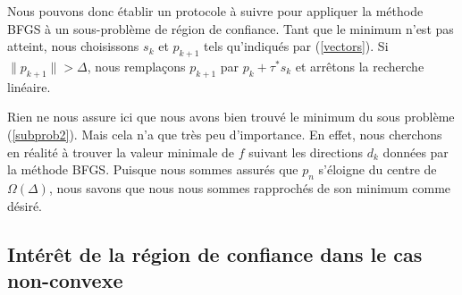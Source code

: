 \noindent
Nous pouvons donc établir un protocole à suivre pour appliquer la méthode BFGS à un sous-problème de région de confiance. Tant que le minimum n'est pas atteint, nous choisissons $s_k$ et $p_{k+1}$ tels qu'indiqués par (\ref{vectors}). Si $\|p_{k+1}\| > \Delta$, nous remplaçons $p_{k+1}$ par $p_k + \tau^* s_k$ et arrêtons la recherche linéaire.

\begin{remarque}
    Rien ne nous assure ici que nous avons bien trouvé le minimum du sous problème (\ref{subprob2}). Mais cela n'a que très peu d'importance. En effet, nous cherchons en réalité à trouver la valeur minimale de $f$ suivant les directions $d_k$ données par la méthode BFGS. Puisque nous sommes assurés que $p_n$ s'éloigne du centre de $\Omega(\Delta)$, nous savons que nous nous sommes rapprochés de son minimum comme désiré.
\end{remarque}


\subsection{Intérêt de la région de confiance dans le cas non-convexe}